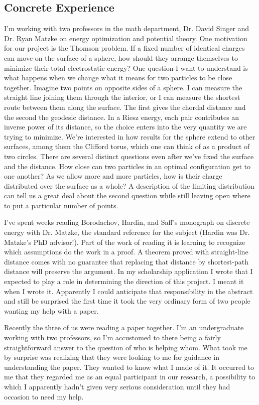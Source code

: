 \documentclass[12pt,letterpaper]{article}
\begin{document}
\subsection{Concrete Experience}
I'm working with two professors in the math department, Dr. David Singer and Dr. Ryan Matzke on energy optimization and potential theory. One motivation for our project is the Thomson problem. If a fixed number of identical charges can move on the surface of a sphere, how should they arrange themselves to minimize their total electrostatic energy? One question I want to understand is what happens when we change what it means for two particles to be close together. Imagine two points on opposite sides of a sphere. I can measure the straight line joining them through the interior, or I can measure the shortest route between them along the surface. The first gives the chordal distance and the second the geodesic distance. In a Riesz energy, each pair contributes an inverse power of its distance, so the choice enters into the very quantity we are trying to minimize. We're interested in how results for the sphere extend to other surfaces, among them the Clifford torus, which one can think of as a product of two circles. There are several distinct questions even after we've fixed the surface and the distance. How close can two particles in an optimal configuration get to one another? As we allow more and more particles, how is their charge distributed over the surface as a whole? A description of the limiting distribution can tell us a great deal about the second question while still leaving open where to put a particular number of points.

I've spent weeks reading Borodachov, Hardin, and Saff's monograph on discrete energy with Dr. Matzke, the standard reference for the subject (Hardin was Dr. Matzke's PhD advisor!). Part of the work of reading it is learning to recognize which assumptions do the work in a proof. A theorem proved with straight-line distance comes with no guarantee that replacing that distance by shortest-path distance will preserve the argument. In my scholarship application I wrote that I expected to play a role in determining the direction of this project. I meant it when I wrote it. Apparently I could anticipate that responsibility in the abstract and still be surprised the first time it took the very ordinary form of two people wanting my help with a paper.

Recently the three of us were reading a paper together. I'm an undergraduate working with two professors, so I'm accustomed to there being a fairly straightforward answer to the question of who is helping whom. What took me by surprise was realizing that they were looking to me for guidance in understanding the paper. They wanted to know what I made of it. It occurred to me that they regarded me as an equal participant in our research, a possibility to which I apparently hadn't given very serious consideration until they had occasion to need my help.
\end{document}
